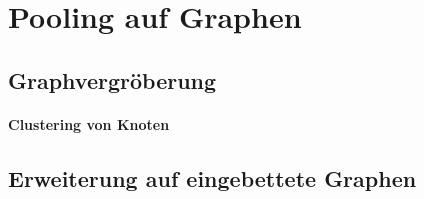 \section{Pooling auf Graphen}
\label{pooling}

\subsection{Graphvergröberung}
\label{graphvergroeberung}

\paragraph{Clustering von Knoten}
\label{clustering_von_knoten}

\subsection{Erweiterung auf eingebettete Graphen}
\label{pooling_erweiterung}
